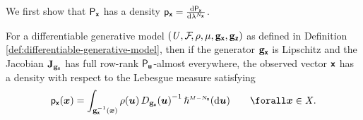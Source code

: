 We first show that $\mathsf{P}_{\boldsymbol{\mathsf{x}}}$ has a density $\pden{\rvct{x}} = \td{\prob{\rvct{x}}}{\lebm{N_{\rvct{x}}}}$.

\begin{proposition}\label{prop:change-of-variables-in-dgm}
For a differentiable generative model $(\mathit{U},\mathcal{F}\kern-2pt,\rho,\mu,{\mathbf{g}}_{\boldsymbol{\mathsf{x}}},{\mathbf{g}}_{\boldsymbol{\mathsf{z}}})$ as defined in Definition \ref{def:differentiable-generative-model}, then if the generator ${\mathbf{g}}_{\boldsymbol{\mathsf{x}}}$ is Lipschitz and the Jacobian $\mathbf{J}_{{\mathbf{g}}_{\boldsymbol{\mathsf{x}}}}$ has full row-rank $\mathsf{P}_{\boldsymbol{\mathsf{u}}}$-almost everywhere, the observed vector $\boldsymbol{\mathsf{x}}$ has a density with respect to the Lebesgue measure satisfying
\begin{equation}\label{eq:dgm-marginal-density-x}
  \pden{\rvct{x}}({\vct{x}})  =
  \int_{\preimage{\genfunc_{\rvct{x}}}{\vct{x}}}
    \rho(\vct{u})\,
    \jacobproddet{\genfunc_{\rvct{x}}}{\vct{u}}^{-1}
  \,\haum{M-N_{\rvct{x}}}(\dr\vct{u})
  \qquad \forall \vct{x} \in\set{X}.
\end{equation}
\end{proposition}
